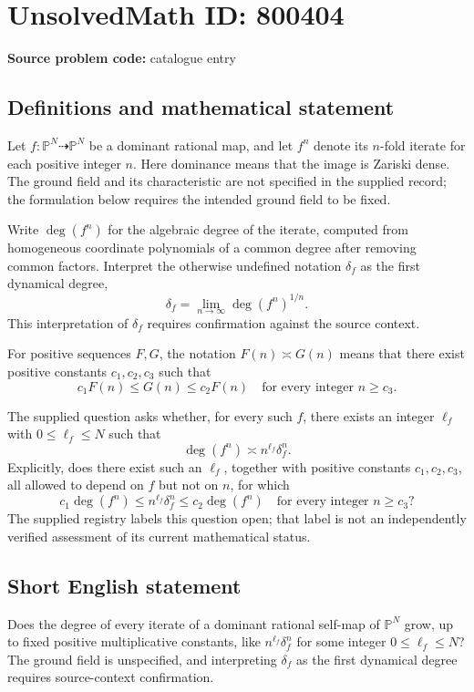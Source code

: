 \documentclass[11pt]{article}
\newcommand{\PP}{\mathbb{P}}
\begin{document}
\section*{UnsolvedMath ID: 800404}
\textbf{Source problem code:} catalogue entry
\subsection{Definitions and mathematical statement}
Let \(f\colon\PP^N\dashrightarrow\PP^N\) be a dominant rational map, and let \(f^n\) denote its \(n\)-fold iterate for each positive integer \(n\). Here dominance means that the image is Zariski dense. The ground field and its characteristic are not specified in the supplied record; the formulation below requires the intended ground field to be fixed.

Write \(\deg(f^n)\) for the algebraic degree of the iterate, computed from homogeneous coordinate polynomials of a common degree after removing common factors. Interpret the otherwise undefined notation \(\delta_f\) as the first dynamical degree,
\[
\delta_f=\lim_{n\to\infty}\deg(f^n)^{1/n}.
\]
This interpretation of \(\delta_f\) requires confirmation against the source context.

For positive sequences \(F,G\), the notation \(F(n)\asymp G(n)\) means that there exist positive constants \(c_1,c_2,c_3\) such that
\[
c_1F(n)\le G(n)\le c_2F(n)
\quad\text{for every integer }n\ge c_3.
\]

The supplied question asks whether, for every such \(f\), there exists an integer \(\ell_f\) with \(0\le\ell_f\le N\) such that
\[
\deg(f^n)\asymp n^{\ell_f}\delta_f^n.
\]
Explicitly, does there exist such an \(\ell_f\), together with positive constants \(c_1,c_2,c_3\), all allowed to depend on \(f\) but not on \(n\), for which
\[
c_1\deg(f^n)\le n^{\ell_f}\delta_f^n\le c_2\deg(f^n)
\quad\text{for every integer }n\ge c_3?
\]
The supplied registry labels this question open; that label is not an independently verified assessment of its current mathematical status.
\subsection{Short English statement}
Does the degree of every iterate of a dominant rational self-map of \(\PP^N\) grow, up to fixed positive multiplicative constants, like \(n^{\ell_f}\delta_f^n\) for some integer \(0\le\ell_f\le N\)? The ground field is unspecified, and interpreting \(\delta_f\) as the first dynamical degree requires source-context confirmation.
\end{document}
